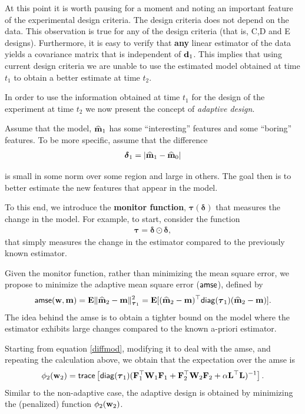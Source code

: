 \documentclass[leqno,onefignum,onetabnum]{siamltexmm}
\newcommand{\bfE}	{{\bf{E}}}
\newcommand{\bfF}	{{\bf{F}}}
\newcommand{\bfL}	{{\bf{L}}}
\newcommand{\bfW}	{{\bf{W}}}
\newcommand{\bfd}	{{\bf{d}}}
\newcommand{\bfm}	{{\bf{m}}}
\newcommand{\bfw}	{{\bf{w}}}
\newcommand{\bftau}      {{\boldsymbol \tau}}
\newcommand{\bfdelta}	 { { \boldsymbol \delta} }
\newcommand{\bfmhat}    {{\widehat{\bfm}}}
\newcommand{\LtL}       { \bfL^{\top}\bfL}
\begin{document}
At this point it is worth  pausing for a moment and noting an important feature of the experimental design criteria. 
 The design criteria does not depend on the data. This observation is true for any of the 
 design criteria  (that is, C,D and E designs). 
 Furthermore, it is easy to verify that {\bf any} linear estimator of the data 
 yields a covariance matrix that is independent of $\bfd_{1}$.
 This implies that using current design criteria we are unable to
 use the estimated model obtained at time $t_{1}$  to obtain a better estimate at time $t_{2}$.

In order to use the information obtained at time $t_{1}$ for the design of the experiment at time $t_{2}$
 we now present the concept of {\em adaptive design}.

 Assume that the model, $\bfmhat_{1}$ has some ``interesting'' features and some ``boring'' features.
To be more specific, assume that the difference
\begin{align*}
 \bfdelta_{1} = |\bfmhat_{1} - \bfmhat_{0}|
\end{align*}


is small in some norm over some region and large in others. The goal then is to better estimate the new features
that appear in the model.

To this end, we introduce the {\bf monitor function}, $\bftau(\bfdelta)$ that measures
the change in the model. 
For example, to start, consider the function
\begin{align}
\label{taufuns}
\bftau = \bfdelta \odot \bfdelta,
\end{align}
that simply measures the change in the estimator
compared to the previously known estimator. 

Given the monitor function,
rather than minimizing the mean square error, we propose to minimize the
adaptive mean square error (${\sf amse}$), defined by
\begin{align}
\label{amse}
{\sf amse}(\bfw,\bfm) = \bfE\| \bfmhat_2 -\bfm \|_{\bftau_1}^{2} = 
 \bfE[(\bfmhat_2 -\bfm)^{\top}{\sf diag}(\bftau_1)(\bfmhat_2 -\bfm)].
 \end{align}
The idea behind the {\sf amse} is to obtain a tighter bound on the model where the estimator exhibits large changes
compared to the known a-priori estimator. 

Starting from  equation \eqref{diffmod}, modifying it to deal with the {\sf amse}, and repeating the calculation above, we obtain that the expectation 
over the {\sf amse} is
\begin{align}
\label{design2ad}
\phi_{2}(\bfw_{2}) =  {\sf trace} \left[  {\sf diag}(\bftau_1) (\bfF_{1}^{\top}\bfW_{1}\bfF_{1}   + \bfF_{2}^{\top}\bfW_{2}\bfF_{2} +
\alpha \LtL)^{-1} \right]. 
\end{align}
Similar to the non-adaptive case, the adaptive design is obtained by minimizing the (penalized) 
function $\phi_{2}(\bfw_{2})$.
\end{document}
